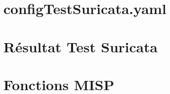 %
%

\section{configTestSuricata.yaml}
\label{chap:annexe1}


\newpage

\section{Résultat Test Suricata}
\label{chap:annexe2}


\newpage

\section{Fonctions MISP}
\label{chap:annexe3}
